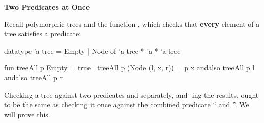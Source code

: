 \newpage
{}

\textbf{Two Predicates at Once}

Recall polymorphic trees and the function , which checks that
\textbf{every} element of a tree satisfies a predicate:
\begin{codeblock}
  datatype 'a tree = Empty | Node of 'a tree * 'a * 'a tree

  fun treeAll p Empty = true
    | treeAll p (Node (l, x, r)) =
        p x andalso treeAll p l andalso treeAll p r
\end{codeblock}

Checking a tree against two predicates  and  separately, and
-ing the results, ought to be the same as checking it once against
the combined predicate `` and ''. We will prove this.

